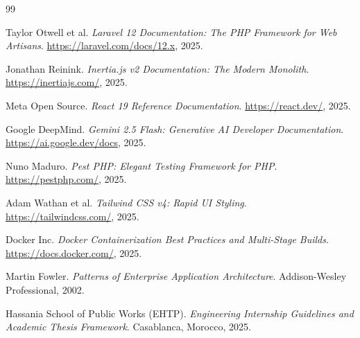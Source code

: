 \documentclass[12pt,a4paper,oneside]{report}
\begin{document}
\begin{thebibliography}{99}

Taylor Otwell et al.
\newblock \emph{Laravel 12 Documentation: The PHP Framework for Web Artisans}.
\newblock \url{https://laravel.com/docs/12.x}, 2025.

Jonathan Reinink.
\newblock \emph{Inertia.js v2 Documentation: The Modern Monolith}.
\newblock \url{https://inertiajs.com/}, 2025.

Meta Open Source.
\newblock \emph{React 19 Reference Documentation}.
\newblock \url{https://react.dev/}, 2025.

Google DeepMind.
\newblock \emph{Gemini 2.5 Flash: Generative AI Developer Documentation}.
\newblock \url{https://ai.google.dev/docs}, 2025.

Nuno Maduro.
\newblock \emph{Pest PHP: Elegant Testing Framework for PHP}.
\newblock \url{https://pestphp.com/}, 2025.

Adam Wathan et al.
\newblock \emph{Tailwind CSS v4: Rapid UI Styling}.
\newblock \url{https://tailwindcss.com/}, 2025.

Docker Inc.
\newblock \emph{Docker Containerization Best Practices and Multi-Stage Builds}.
\newblock \url{https://docs.docker.com/}, 2025.

Martin Fowler.
\newblock \emph{Patterns of Enterprise Application Architecture}.
\newblock Addison-Wesley Professional, 2002.

Hassania School of Public Works (EHTP).
\newblock \emph{Engineering Internship Guidelines and Academic Thesis Framework}.
\newblock Casablanca, Morocco, 2025.

\end{thebibliography}
\end{document}
